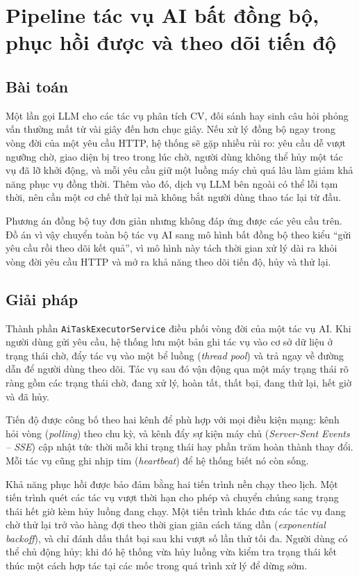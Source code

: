 \documentclass[../DoAn.tex]{subfiles}
\begin{document}
\section{Pipeline tác vụ AI bất đồng bộ, phục hồi được và theo dõi tiến độ}
\label{sec:ch5-async}

\subsection{Bài toán}

Một lần gọi LLM cho các tác vụ phân tích CV, đối sánh hay sinh câu hỏi phỏng vấn thường mất từ vài giây đến hơn chục giây. Nếu xử lý đồng bộ ngay trong vòng đời của một yêu cầu HTTP, hệ thống sẽ gặp nhiều rủi ro: yêu cầu dễ vượt ngưỡng chờ, giao diện bị treo trong lúc chờ, người dùng không thể hủy một tác vụ đã lỡ khởi động, và mỗi yêu cầu giữ một luồng máy chủ quá lâu làm giảm khả năng phục vụ đồng thời. Thêm vào đó, dịch vụ LLM bên ngoài có thể lỗi tạm thời, nên cần một cơ chế thử lại mà không bắt người dùng thao tác lại từ đầu.

Phương án đồng bộ tuy đơn giản nhưng không đáp ứng được các yêu cầu trên. Đồ án vì vậy chuyển toàn bộ tác vụ AI sang mô hình bất đồng bộ theo kiểu ``gửi yêu cầu rồi theo dõi kết quả'', vì mô hình này tách thời gian xử lý dài ra khỏi vòng đời yêu cầu HTTP và mở ra khả năng theo dõi tiến độ, hủy và thử lại.

\subsection{Giải pháp}

Thành phần \texttt{AiTaskExecutorService} điều phối vòng đời của một tác vụ AI. Khi người dùng gửi yêu cầu, hệ thống lưu một bản ghi tác vụ vào cơ sở dữ liệu ở trạng thái chờ, đẩy tác vụ vào một bể luồng (\textit{thread pool}) và trả ngay về đường dẫn để người dùng theo dõi. Tác vụ sau đó vận động qua một máy trạng thái rõ ràng gồm các trạng thái chờ, đang xử lý, hoàn tất, thất bại, đang thử lại, hết giờ và đã hủy.

Tiến độ được công bố theo hai kênh để phù hợp với mọi điều kiện mạng: kênh hỏi vòng (\textit{polling}) theo chu kỳ, và kênh đẩy sự kiện máy chủ (\textit{Server-Sent Events -- SSE}) cập nhật tức thời mỗi khi trạng thái hay phần trăm hoàn thành thay đổi. Mỗi tác vụ cũng ghi nhịp tim (\textit{heartbeat}) để hệ thống biết nó còn sống.

Khả năng phục hồi được bảo đảm bằng hai tiến trình nền chạy theo lịch. Một tiến trình quét các tác vụ vượt thời hạn cho phép và chuyển chúng sang trạng thái hết giờ kèm hủy luồng đang chạy. Một tiến trình khác đưa các tác vụ đang chờ thử lại trở vào hàng đợi theo thời gian giãn cách tăng dần (\textit{exponential backoff}), và chỉ đánh dấu thất bại sau khi vượt số lần thử tối đa. Người dùng có thể chủ động hủy; khi đó hệ thống vừa hủy luồng vừa kiểm tra trạng thái kết thúc một cách hợp tác tại các mốc trong quá trình xử lý để dừng sớm.
\end{document}
